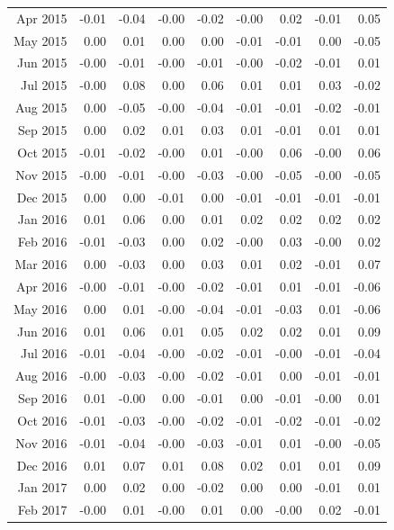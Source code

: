 \begin{tabularx}{\textwidth}{rrrrrrrrr}
  Apr 2015 & -0.01 & -0.04 & -0.00 & -0.02 & -0.00 & 0.02 & -0.01 & 0.05 \\ 
  May 2015 & 0.00 & 0.01 & 0.00 & 0.00 & -0.01 & -0.01 & 0.00 & -0.05 \\ 
  Jun 2015 & -0.00 & -0.01 & -0.00 & -0.01 & -0.00 & -0.02 & -0.01 & 0.01 \\ 
  Jul 2015 & -0.00 & 0.08 & 0.00 & 0.06 & 0.01 & 0.01 & 0.03 & -0.02 \\ 
  Aug 2015 & 0.00 & -0.05 & -0.00 & -0.04 & -0.01 & -0.01 & -0.02 & -0.01 \\ 
  Sep 2015 & 0.00 & 0.02 & 0.01 & 0.03 & 0.01 & -0.01 & 0.01 & 0.01 \\ 
  Oct 2015 & -0.01 & -0.02 & -0.00 & 0.01 & -0.00 & 0.06 & -0.00 & 0.06 \\ 
  Nov 2015 & -0.00 & -0.01 & -0.00 & -0.03 & -0.00 & -0.05 & -0.00 & -0.05 \\ 
  Dec 2015 & 0.00 & 0.00 & -0.01 & 0.00 & -0.01 & -0.01 & -0.01 & -0.01 \\ 
  Jan 2016 & 0.01 & 0.06 & 0.00 & 0.01 & 0.02 & 0.02 & 0.02 & 0.02 \\ 
  Feb 2016 & -0.01 & -0.03 & 0.00 & 0.02 & -0.00 & 0.03 & -0.00 & 0.02 \\ 
  Mar 2016 & 0.00 & -0.03 & 0.00 & 0.03 & 0.01 & 0.02 & -0.01 & 0.07 \\ 
  Apr 2016 & -0.00 & -0.01 & -0.00 & -0.02 & -0.01 & 0.01 & -0.01 & -0.06 \\ 
  May 2016 & 0.00 & 0.01 & -0.00 & -0.04 & -0.01 & -0.03 & 0.01 & -0.06 \\ 
  Jun 2016 & 0.01 & 0.06 & 0.01 & 0.05 & 0.02 & 0.02 & 0.01 & 0.09 \\ 
  Jul 2016 & -0.01 & -0.04 & -0.00 & -0.02 & -0.01 & -0.00 & -0.01 & -0.04 \\ 
  Aug 2016 & -0.00 & -0.03 & -0.00 & -0.02 & -0.01 & 0.00 & -0.01 & -0.01 \\ 
  Sep 2016 & 0.01 & -0.00 & 0.00 & -0.01 & 0.00 & -0.01 & -0.00 & 0.01 \\ 
  Oct 2016 & -0.01 & -0.03 & -0.00 & -0.02 & -0.01 & -0.02 & -0.01 & -0.02 \\ 
  Nov 2016 & -0.01 & -0.04 & -0.00 & -0.03 & -0.01 & 0.01 & -0.00 & -0.05 \\ 
  Dec 2016 & 0.01 & 0.07 & 0.01 & 0.08 & 0.02 & 0.01 & 0.01 & 0.09 \\ 
  Jan 2017 & 0.00 & 0.02 & 0.00 & -0.02 & 0.00 & 0.00 & -0.01 & 0.01 \\ 
  Feb 2017 & -0.00 & 0.01 & -0.00 & 0.01 & 0.00 & -0.00 & 0.02 & -0.01 \\ 

\end{tabularx}
